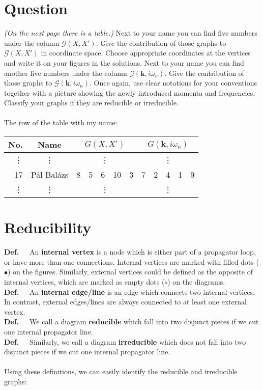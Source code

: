 \section*{Question}
\textit{(On the next page there is a table.)} Next to your name you can find five numbers under the column $\mathcal{G} \left( X, X' \right)$. Give the contribution of those graphs to $\mathcal{G} \left( X, X' \right)$ in coordinate space. Choose appropriate coordinates at the vertices and write it on your figures in the solutions. Next to your name you can find another five numbers under the column $\mathcal{G} \left( \boldsymbol{k}, i \omega_{n} \right)$. Give the contribution of those graphs to $\mathcal{G} \left( \boldsymbol{k}, i \omega_{n} \right)$. Once again, use clear notations for your conventions together with a picture showing the newly introduced momenta and frequencies. Classify your graphs if they are reducible or irreducible. \\ \\
The row of the table with my name:
\begin{center}
\begin{tabular}{|r|c|c|c|c|c|c||c|c|c|c|c|}
\hline
No.    & Name       & \multicolumn{5}{c||}{$G \left( X, X' \right)$} & \multicolumn{5}{c|}{$G \left( \boldsymbol{k}, i \omega_{n} \right)$} \\
\hline
\vdots & \vdots     & \multicolumn{5}{c||}{\vdots}                   & \multicolumn{5}{c|}{\vdots}        \\
\hline
17     & Pál Balázs &  8  &  5  &  6  &  10  &  3                    &  7  &  2  &  4  &  1  &  9         \\
\hline
\vdots & \vdots     & \multicolumn{5}{c||}{\vdots}                   & \multicolumn{5}{c|}{\vdots}        \\
\hline
\end{tabular}
\end{center}

\section*{Reducibility}
\textbf{Def.}\ \ \ An \textbf{internal vertex} is a node which is either part of a propagator loop, or have more than one connections. Internal vertices are marked with filled dots ($\bullet$) on the figures. Similarly, external vertices could be defined as the opposite of internal vertices, which are marked as empty dots ($\circ$) on the diagrams. \\
\textbf{Def.}\ \ \ An \textbf{internal edge/line} is an edge which connects two internal vertices. In contrast, external edges/lines are always connected to at least one external vertex. \\
\textbf{Def.}\ \ \ We call a diagram \textbf{reducible} which fall into two disjunct pieces if we cut one internal propagator line. \\
\textbf{Def.}\ \ \ Similarly, we call a diagram \textbf{irreducible} which does not fall into two disjunct pieces if we cut one internal propagator line. \\ \\
Using these definitions, we can easily identify the reducible and irreducible graphs:

